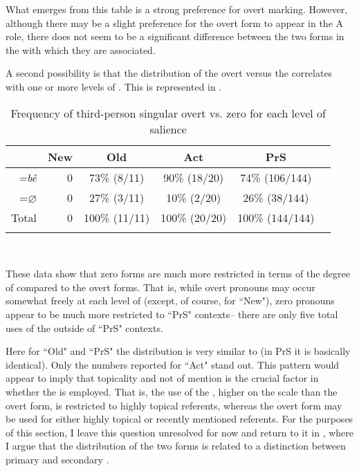 What emerges from this table is a strong preference for overt marking. However, although there may be a slight preference for the overt form to appear in the A role, there does not seem to be a significant difference between the two forms in the  with which they are associated.

A second possibility is that the distribution of the overt versus the  correlates with one or more levels of . This is represented in .

\begin{table}

\caption{{Frequency of third-person singular overt vs. zero for each level of salience}}
\begin{tabular}{ r   r  c  c  c  c }
\lsptoprule
 & New & Old & Act & PrS \\

\midrule
\textit{=b\v{e}} & 0 & 73{\%} (8/11) & 90{\%} (18/20) & 74{\%} (106/144) \\

\textsc{=$\varnothing$} & 0 & 27{\%} (3/11) & 10{\%} (2/20) & 26{\%} (38/144) \\

\midrule
Total& 0 & 100{\%} (11/11) & 100{\%} (20/20) & 100{\%} (144/144)  \\

\lspbottomrule
\end{tabular}\\
\label{overtvszerovsgiven}

\end{table}

These data show that zero forms are much more restricted in terms of the degree of  compared to the overt forms. That is, while overt pronouns may occur somewhat freely at each level of  (except, of course, for ``New"), zero pronouns appear to be much more restricted to ``PrS" contexts-- there are only five total uses of the  outside of ``PrS" contexts.

Here for ``Old" and ``PrS" the distribution is very similar to  (in PrS it is basically identical). Only the numbers reported for ``Act" stand out. This pattern would appear to imply that topicality and not  of mention is the crucial factor in whether the  is employed. That is, the use of the , higher on the  scale than the overt form, is restricted to highly topical referents, whereas the overt form may be used for either highly topical or recently mentioned referents. For the purposes of this section, I leave this question unresolved for now and return to it in , where I argue that the distribution of the two forms is related to a distinction between primary and secondary . 
 

